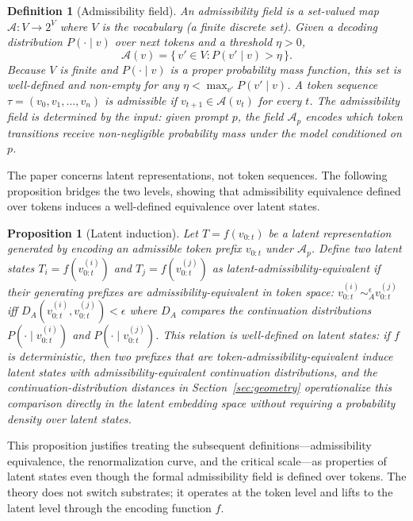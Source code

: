\documentclass[11pt]{article}
\newtheorem{definition}{Definition}
\newtheorem{proposition}{Proposition}
\begin{document}
\begin{definition}[Admissibility field]
An admissibility field is a set-valued map $\mathcal{A}: V \to 2^V$ where $V$ is the
vocabulary (a finite discrete set). Given a decoding distribution $P(\cdot \mid v)$ over next
tokens and a threshold $\eta > 0$,
\begin{equation}
\mathcal{A}(v) = \bigl\{\, v' \in V : P(v' \mid v) > \eta \,\bigr\}.
\end{equation}
Because $V$ is finite and $P(\cdot \mid v)$ is a proper probability mass function,
this set is well-defined and non-empty for any $\eta < \max_{v'} P(v' \mid v)$.
A token sequence $\tau = (v_0, v_1, \ldots, v_n)$ is admissible if $v_{t+1} \in \mathcal{A}(v_t)$
for every $t$. The admissibility field is determined by the input: given prompt $p$, the field
$\mathcal{A}_p$ encodes which token transitions receive non-negligible probability mass under
the model conditioned on $p$.
\end{definition}

The paper concerns latent representations, not token sequences. The following proposition
bridges the two levels, showing that admissibility equivalence defined over tokens induces a
well-defined equivalence over latent states.

\begin{proposition}[Latent induction]
\label{prop:induction}
Let $T = f(v_{0:t})$ be a latent representation generated by encoding an admissible token
prefix $v_{0:t}$ under $\mathcal{A}_p$. Define two latent states $T_i = f(v_{0:t}^{(i)})$
and $T_j = f(v_{0:t}^{(j)})$ as latent-admissibility-equivalent if their generating prefixes
are admissibility-equivalent in token space: $v_{0:t}^{(i)} \sim_A^\epsilon v_{0:t}^{(j)}$
iff $D_A(v_{0:t}^{(i)}, v_{0:t}^{(j)}) < \epsilon$ where $D_A$ compares the continuation
distributions $P(\cdot \mid v_{0:t}^{(i)})$ and $P(\cdot \mid v_{0:t}^{(j)})$.
This relation is well-defined on latent states: if $f$ is deterministic, then two prefixes
that are token-admissibility-equivalent induce latent states with admissibility-equivalent
continuation distributions, and the continuation-distribution distances in
Section~\ref{sec:geometry} operationalize this comparison directly in the latent embedding
space without requiring a probability density over latent states.
\end{proposition}

\noindent This proposition justifies treating the subsequent definitions---admissibility
equivalence, the renormalization curve, and the critical scale---as properties of latent states
even though the formal admissibility field is defined over tokens. The theory does not switch
substrates; it operates at the token level and lifts to the latent level through the encoding
function $f$.
\end{document}
